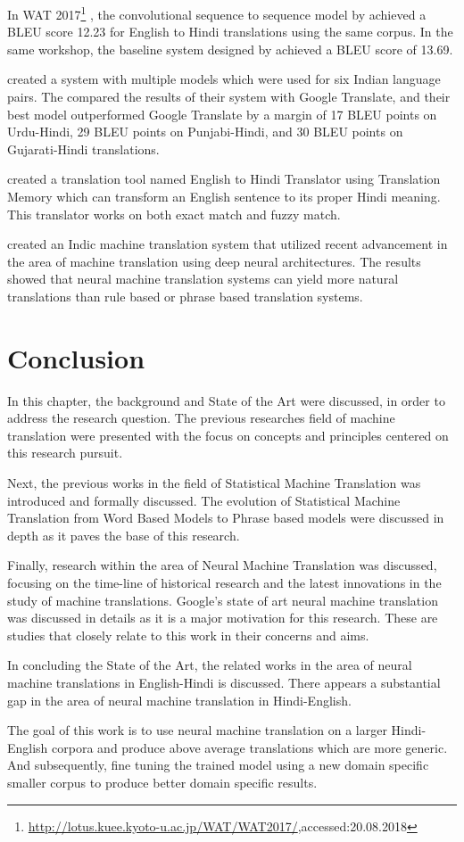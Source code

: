 In WAT 2017\footnote{{\url{http://lotus.kuee.kyoto-u.ac.jp/WAT/WAT2017/},accessed:20.08.2018}} , the convolutional sequence to sequence model by  \cite{Singh2017ComparingRA} achieved a BLEU score 12.23 for English to Hindi translations using the same corpus. In the same workshop, the baseline system designed by \cite{W17-5707} achieved a BLEU score of 13.69. 


\cite{Revanuru:2017:NMT:3140107.3140111} created a system with multiple models which were used for six Indian language pairs. The compared the results of their system with Google Translate, and their best model outperformed Google Translate by a margin of 17 BLEU points on Urdu-Hindi, 29 BLEU points on Punjabi-Hindi, and 30 BLEU points on Gujarati-Hindi translations.

\cite{10.1007/978-3-319-63645-0_55} created a translation tool named English to Hindi Translator using Translation Memory which can transform an English sentence to its proper Hindi meaning. This translator works on both exact match and fuzzy match. 

\cite{10.1007/978-981-10-8657-1_62} created an Indic machine translation system that utilized recent advancement in the area of machine translation using deep neural architectures. The results showed that neural machine translation systems can yield more natural translations than rule based or phrase based translation systems.

\section{Conclusion}

In this chapter, the background and State of the Art were discussed, in order to address the research question. The previous researches field of machine translation were presented with the focus on concepts and principles centered on this research pursuit.

Next, the previous works in the field of Statistical Machine Translation was introduced and formally discussed. The evolution of Statistical Machine Translation from Word Based Models to Phrase based models were discussed in depth as it paves the base of this research.

Finally, research within the area of Neural Machine Translation was discussed, focusing on the time-line of historical research and the latest innovations in the study of machine translations. Google's state of art neural machine translation was discussed in details as it is a major motivation for this research. These are studies that closely relate to this work in their concerns and aims.

In concluding the State of the Art, the related works in the area of neural machine translations in English-Hindi  is discussed. There appears a substantial gap in the area of neural machine translation in Hindi-English. 

The goal of this work is to use neural machine translation on a larger Hindi-English corpora and produce above average translations which are more generic. And subsequently, fine tuning the trained model using a new domain specific smaller corpus to produce better domain specific results.  
